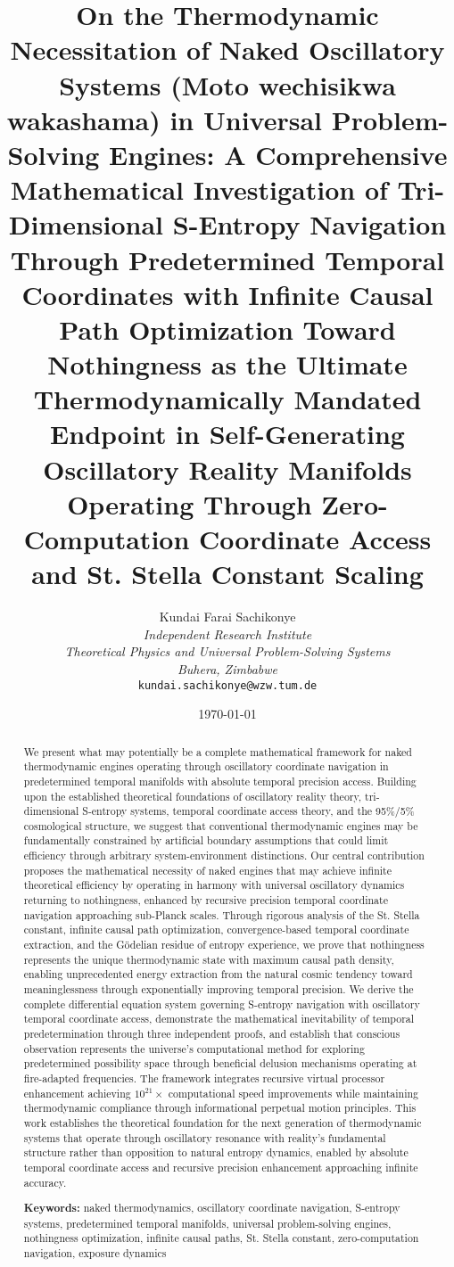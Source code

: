 \documentclass[11pt,a4paper]{article}
\title{On the Thermodynamic Necessitation of Naked Oscillatory Systems (Moto wechisikwa wakashama) in Universal Problem-Solving Engines: A Comprehensive Mathematical Investigation of Tri-Dimensional S-Entropy Navigation Through Predetermined Temporal Coordinates with Infinite Causal Path Optimization Toward Nothingness as the Ultimate Thermodynamically Mandated Endpoint in Self-Generating Oscillatory Reality Manifolds Operating Through Zero-Computation Coordinate Access and St. Stella Constant Scaling}
\author{
Kundai Farai Sachikonye\\
\textit{Independent Research Institute}\\
\textit{Theoretical Physics and Universal Problem-Solving Systems}\\
\textit{Buhera, Zimbabwe}\\
\texttt{kundai.sachikonye@wzw.tum.de}
}
\date{\today}
\theoremstyle{remark}
\begin{document}
\maketitle

\begin{abstract}
We present what may potentially be a complete mathematical framework for naked thermodynamic engines operating through oscillatory coordinate navigation in predetermined temporal manifolds with absolute temporal precision access. Building upon the established theoretical foundations of oscillatory reality theory, tri-dimensional S-entropy systems, temporal coordinate access theory, and the 95\%/5\% cosmological structure, we suggest that conventional thermodynamic engines may be fundamentally constrained by artificial boundary assumptions that could limit efficiency through arbitrary system-environment distinctions. Our central contribution proposes the mathematical necessity of naked engines that may achieve infinite theoretical efficiency by operating in harmony with universal oscillatory dynamics returning to nothingness, enhanced by recursive precision temporal coordinate navigation approaching sub-Planck scales. Through rigorous analysis of the St. Stella constant, infinite causal path optimization, convergence-based temporal coordinate extraction, and the Gödelian residue of entropy experience, we prove that nothingness represents the unique thermodynamic state with maximum causal path density, enabling unprecedented energy extraction from the natural cosmic tendency toward meaninglessness through exponentially improving temporal precision. We derive the complete differential equation system governing S-entropy navigation with oscillatory temporal coordinate access, demonstrate the mathematical inevitability of temporal predetermination through three independent proofs, and establish that conscious observation represents the universe's computational method for exploring predetermined possibility space through beneficial delusion mechanisms operating at fire-adapted frequencies. The framework integrates recursive virtual processor enhancement achieving $10^{21}\times$ computational speed improvements while maintaining thermodynamic compliance through informational perpetual motion principles. This work establishes the theoretical foundation for the next generation of thermodynamic systems that operate through oscillatory resonance with reality's fundamental structure rather than opposition to natural entropy dynamics, enabled by absolute temporal coordinate access and recursive precision enhancement approaching infinite accuracy.

\textbf{Keywords:} naked thermodynamics, oscillatory coordinate navigation, S-entropy systems, predetermined temporal manifolds, universal problem-solving engines, nothingness optimization, infinite causal paths, St. Stella constant, zero-computation navigation, exposure dynamics
\end{abstract}
\end{document}
